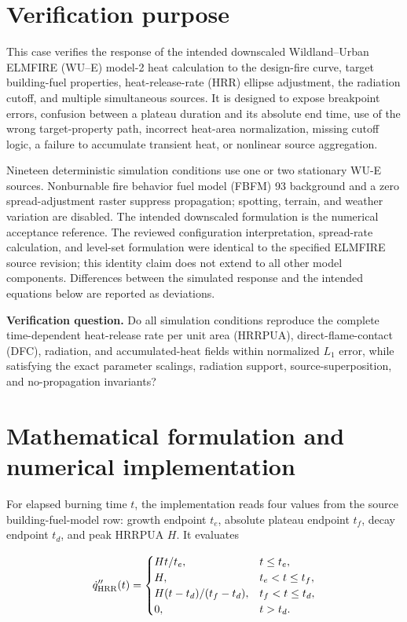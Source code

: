 \section{Verification purpose}

This case verifies the response of the intended downscaled Wildland--Urban ELMFIRE (WU--E) model-2 heat
calculation to the design-fire curve, target building-fuel properties,
heat-release-rate (HRR) ellipse adjustment, the radiation cutoff, and multiple simultaneous
sources.  It is designed to expose breakpoint errors, confusion between a
plateau duration and its absolute end time, use of the wrong target-property
path, incorrect heat-area normalization, missing cutoff logic, a failure to
accumulate transient heat, or nonlinear source aggregation.

Nineteen deterministic simulation conditions use one or two stationary WU-E sources.
Nonburnable fire behavior fuel model (FBFM) 93 background and a zero spread-adjustment raster suppress
propagation; spotting, terrain, and weather variation are disabled.  The
intended downscaled formulation is the numerical acceptance reference. The
reviewed configuration interpretation, spread-rate calculation, and level-set
formulation were identical to the specified ELMFIRE source revision; this
identity claim does not extend to all other model components. Differences
between the simulated response and the intended equations below are reported
as deviations.

\textbf{Verification question.} Do all simulation conditions reproduce the complete
time-dependent heat-release rate per unit area (HRRPUA), direct-flame-contact (DFC), radiation, and accumulated-heat
fields within \HeatMapTolerance{} normalized $L_1$ error, while satisfying
the exact parameter scalings, radiation support, source-superposition, and
no-propagation invariants?

\ReportOverview

\section{Mathematical formulation and numerical implementation}

For elapsed burning time $t$, the implementation reads four values from the
source building-fuel-model row: growth endpoint $t_e$, absolute plateau
endpoint $t_f$, decay endpoint $t_d$, and peak HRRPUA $H$.  It evaluates

\begin{equation}
 \dot q''_{\mathrm{HRR}}(t)=
 \begin{cases}
   Ht/t_e, & t\le t_e,\\
   H, & t_e<t\le t_f,\\
   H(t-t_d)/(t_f-t_d), & t_f<t\le t_d,\\
   0, & t>t_d.
 \end{cases}
\end{equation}

